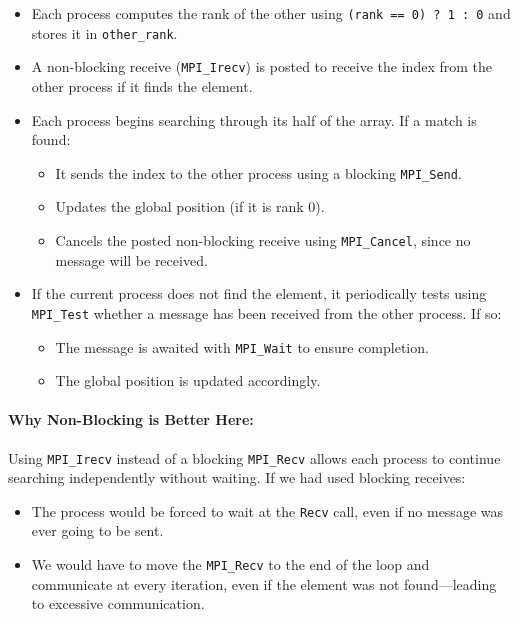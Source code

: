\documentclass[12pt]{book}
\begin{document}
\begin{itemize}
    \item Each process computes the rank of the other using \texttt{(rank == 0) ? 1 : 0} and stores it in \texttt{other\_rank}.
    
    \item A non-blocking receive (\texttt{MPI\_Irecv}) is posted to receive the index from the other process if it finds the element.

    \item Each process begins searching through its half of the array. If a match is found:
    \begin{itemize}
        \item It sends the index to the other process using a blocking \texttt{MPI\_Send}.
        \item Updates the global position (if it is rank 0).
        \item Cancels the posted non-blocking receive using \texttt{MPI\_Cancel}, since no message will be received.
    \end{itemize}
    
    \item If the current process does not find the element, it periodically tests using \texttt{MPI\_Test} whether a message has been received from the other process. If so:
    \begin{itemize}
        \item The message is awaited with \texttt{MPI\_Wait} to ensure completion.
        \item The global position is updated accordingly.
    \end{itemize}
\end{itemize}

\paragraph{Why Non-Blocking is Better Here:}

Using \texttt{MPI\_Irecv} instead of a blocking \texttt{MPI\_Recv} allows each process to continue searching independently without waiting. If we had used blocking receives:
\begin{itemize}
    \item The process would be forced to wait at the \texttt{Recv} call, even if no message was ever going to be sent.
    \item We would have to move the \texttt{MPI\_Recv} to the end of the loop and communicate at every iteration, even if the element was not found—leading to excessive communication.
\end{itemize}
\end{document}
